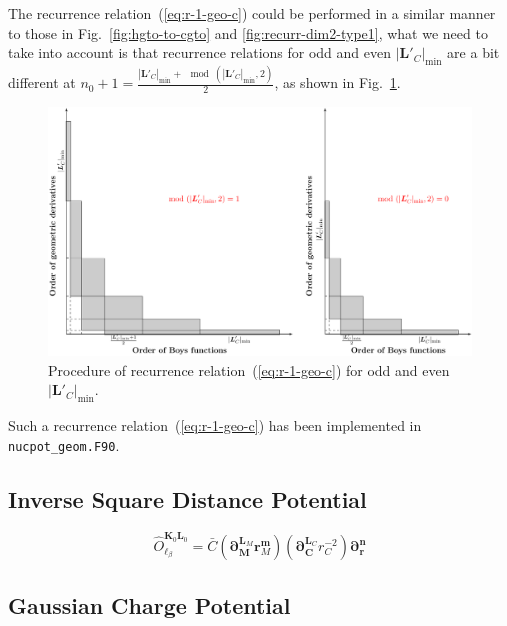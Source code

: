 \documentclass[a4paper,11pt,twoside,openright]{book}
\begin{document}
The recurrence relation~(\ref{eq:r-1-geo-c}) could be performed in a similar manner to those in
Fig.~\ref{fig:hgto-to-cgto} and \ref{fig:recurr-dim2-type1}, what we need to take into account is that
recurrence relations for odd and even $|\boldsymbol{L}'_{C}|_{\min}$ are a bit different at
$n_0+1=\frac{|\boldsymbol{L}'_{C}|_{\min}+\mod(|\boldsymbol{L}'_{C}|_{\min},2)}{2}$, as shown in
Fig.~\ref{fig:nucpot-nderv}.
\begin{figure}[hbtp]
  \centering
  \includegraphics[width=5.5in]{nucpot_geom.pdf}
  \caption{Procedure of recurrence relation~(\ref{eq:r-1-geo-c}) for odd and even $|\boldsymbol{L}'_{C}|_{\min}$.}
  \label{fig:nucpot-nderv}
\end{figure}
Such a recurrence relation~(\ref{eq:r-1-geo-c}) has been implemented in \verb|nucpot_geom.F90|.

\subsection{Inverse Square Distance Potential}
\label{subsec:isdpot}

\begin{equation}
  \hat{O}_{\ell_{\beta}}^{\boldsymbol{K}_{0}\boldsymbol{L}_{0}}%
    =\bar{C}\left(\boldsymbol{\partial}_{\boldsymbol{M}}^{\boldsymbol{L}_{M}}\boldsymbol{r}_{M}^{\boldsymbol{m}}\right)%
      \left(\boldsymbol{\partial}_{\boldsymbol{C}}^{\boldsymbol{L}_{C}}r_{C}^{-2}\right)%
      \boldsymbol{\partial}_{\boldsymbol{r}}^{\boldsymbol{n}}
\end{equation}

\subsection{Gaussian Charge Potential}
\label{subsec:gaupot}
\end{document}
